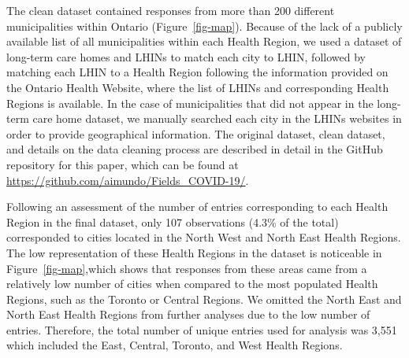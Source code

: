 \documentclass[
  letterpaper,
  DIV=11,
  numbers=noendperiod]{scrartcl}
\begin{document}
The clean dataset contained responses from more than 200 different
municipalities within Ontario (Figure~\ref{fig-map}). Because of the
lack of a publicly available list of all municipalities within each
Health Region, we used a dataset of long-term care homes and LHINs to
match each city to LHIN, followed by matching each LHIN to a Health
Region following the information provided on the Ontario Health Website,
where the list of LHINs and corresponding Health Regions is available.
In the case of municipalities that did not appear in the long-term care
home dataset, we manually searched each city in the LHINs websites in
order to provide geographical information. The original dataset, clean
dataset, and details on the data cleaning process are described in
detail in the GitHub repository for this paper, which can be found at
\url{https://github.com/aimundo/Fields_COVID-19/}.

Following an assessment of the number of entries corresponding to each
Health Region in the final dataset, only 107 observations (4.3\% of the
total) corresponded to cities located in the North West and North East
Health Regions. The low representation of these Health Regions in the
dataset is noticeable in Figure~\ref{fig-map},which shows that responses
from these areas came from a relatively low number of cities when
compared to the most populated Health Regions, such as the Toronto or
Central Regions. We omitted the North East and North East Health Regions
from further analyses due to the low number of entries. Therefore, the
total number of unique entries used for analysis was 3,551 which
included the East, Central, Toronto, and West Health Regions.
\end{document}

